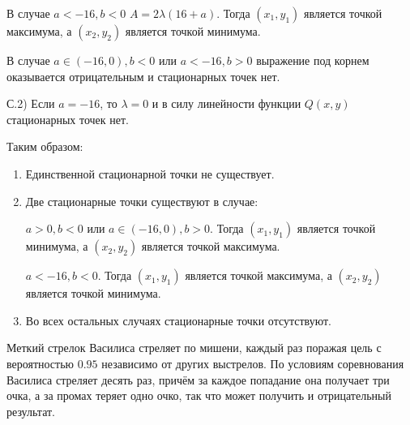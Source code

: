\documentclass[addpoints]{exam} %
\DeclareMathOperator{\E}{\mathbb{E}}
\DeclareMathOperator{\Var}{\mathbb{V}\mathrm{ar}}
\begin{document}
\begin{questions}
\begin{solution}
В случае $a<-16,b<0$ $A=2\lambda (16+a)$. Тогда $\left(x_{1} ,y_{1} \right)$ является точкой максимума, а $\left(x_{2} ,y_{2} \right)$ является точкой минимума.

В случае $a\in \left(-16,0\right),b<0$ или $a<-16,b>0$ выражение под корнем оказывается отрицательным и стационарных точек нет.

С.2) Если $a=-16$, то $\lambda =0$ и в силу линейности функции $Q(x,y)$ стационарных точек нет. 



Таким образом:

\begin{enumerate}
\item  Единственной стационарной точки не существует.

\item  Две стационарные точки существуют в случае:


$a>0,b<0$ или $a\in \left(-16,0\right),b>0$. Тогда $\left(x_{1} ,y_{1} \right)$ является точкой минимума, а $\left(x_{2} ,y_{2} \right)$ является точкой максимума.

$a<-16,b<0$. Тогда $\left(x_{1} ,y_{1} \right)$ является точкой максимума, а $\left(x_{2} ,y_{2} \right)$ является точкой минимума.

\item Во всех остальных случаях стационарные точки отсутствуют.
\end{enumerate}
\end{solution}


\question  Меткий стрелок Василиса стреляет по мишени, каждый раз поражая цель с вероятностью $0.95$ независимо от других выстрелов. По условиям соревнования Василиса стреляет десять раз, причём за каждое попадание она получает три очка, а за промах теряет одно очко, так что может получить и отрицательный результат.
\end{questions}
\end{document}
